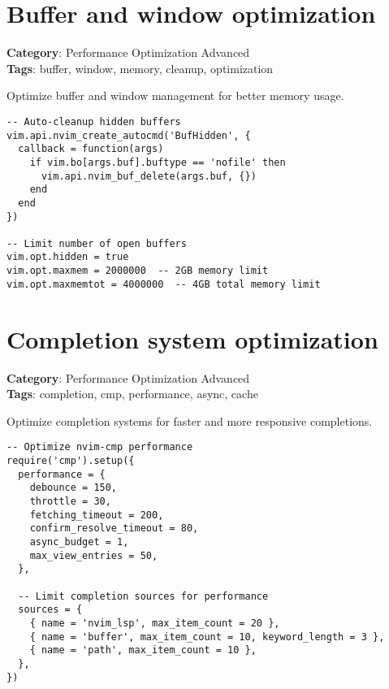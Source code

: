 {{{{{{{{{{\section{Buffer and window optimization}

\textbf{Category}: Performance Optimization Advanced\\ \textbf{Tags}: buffer, window, memory, cleanup, optimization
\vspace{0.5cm}

Optimize buffer and window management for better memory usage.

\begin{Exa*}{}
\begin{Verbatim}[fontsize=\footnotesize, breaklines, breakanywhere]
-- Auto-cleanup hidden buffers
vim.api.nvim_create_autocmd('BufHidden', {
  callback = function(args)
    if vim.bo[args.buf].buftype == 'nofile' then
      vim.api.nvim_buf_delete(args.buf, {})
    end
  end
})

-- Limit number of open buffers
vim.opt.hidden = true
vim.opt.maxmem = 2000000  -- 2GB memory limit
vim.opt.maxmemtot = 4000000  -- 4GB total memory limit
\end{Verbatim}
\end{Exa*}

\section{Completion system optimization}

\textbf{Category}: Performance Optimization Advanced\\ \textbf{Tags}: completion, cmp, performance, async, cache
\vspace{0.5cm}

Optimize completion systems for faster and more responsive completions.

\begin{Exa*}{}
\begin{Verbatim}[fontsize=\footnotesize, breaklines, breakanywhere]
-- Optimize nvim-cmp performance
require('cmp').setup({
  performance = {
    debounce = 150,
    throttle = 30,
    fetching_timeout = 200,
    confirm_resolve_timeout = 80,
    async_budget = 1,
    max_view_entries = 50,
  },
  
  -- Limit completion sources for performance
  sources = {
    { name = 'nvim_lsp', max_item_count = 20 },
    { name = 'buffer', max_item_count = 10, keyword_length = 3 },
    { name = 'path', max_item_count = 10 },
  },
})
\end{Verbatim}
\end{Exa*}

}}}}}}}}}}
